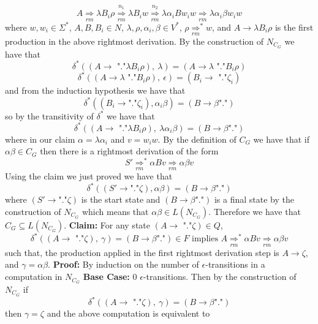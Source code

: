 \documentclass[12pt]{article}
\begin{document}
$$A \underset{rm}{\Longrightarrow} \lambda B_{i}\rho
\overset{n_1}{\underset{rm}{\Longrightarrow}} \lambda B_{i}w
\overset{n_2}{\underset{rm}{\Longrightarrow}} \lambda \alpha _{i}Bw_{i}w
\underset{rm}{\Longrightarrow} \lambda \alpha _{i}\beta w_{i}w$$
where $w,w_i \in \Sigma^*$, $A,B,B_i \in  N$,
$\lambda, \rho, \alpha_i, \beta\in  V^*$,
$\rho \underset{rm}{\Longrightarrow}^* w$, and
$A \rightarrow \lambda B_{i}\rho$ is the first production in the above rightmost
derivation. By the construction of $N_{C_G}$ we have that
$$\delta^*((A \rightarrow \text{ "."}\lambda B_i \rho),\ \lambda) =
(A \rightarrow \lambda\text{ "."} B_i \rho)$$
$$\delta^*((A \rightarrow \lambda\text{ "."} B_i \rho),\ \epsilon) =
(B_i \rightarrow \text{ "."}\zeta_i)$$
and from the induction hypothesis we have that
$$\delta^*((B_i \rightarrow\text{"."}\zeta_i), \alpha_i \beta) =
(B \rightarrow \beta\text{"."})$$
so by the transitivity of $\delta^*$ we have that
$$\delta^*((A \rightarrow \text{ "."}\lambda B_i \rho),\ \lambda\alpha_i\beta) =
(B \rightarrow \beta\text{"."})$$
where in our claim $\alpha = \lambda\alpha_i$ and $v = w_iw$.
By the definition of $C_G$ we have that if $\alpha\beta \in C_G$ then there
is a rightmost derivation of the form
$$S' \underset{rm}{\Longrightarrow}^* \alpha Bv
\underset{rm}{\Longrightarrow} \alpha\beta v$$
Using the claim we just proved we have that
$$\delta^*((S' \rightarrow \text{"."}\zeta), \alpha\beta) =
(B \rightarrow \beta\text{"."})$$
where $(S' \rightarrow \text{"."}\zeta)$ is the start state and
$(B \rightarrow \beta\text{"."})$ is a final state by the construction
of $N_{C_G}$ which means that $\alpha\beta \in L(N_{C_G})$.
Therefore we have that $C_G \subseteq L(N_{C_G})$.
\medskip\newline
\textbf{Claim: } For any state $(A \rightarrow \text{ "."}\zeta) \in Q$,
$$\delta^*((A \rightarrow \text{ "."}\zeta),\ \gamma) =
(B \rightarrow \beta\text{"."}) \in F \text{ implies }
A \underset{rm}{\Longrightarrow}^* \alpha Bv \underset{rm}{\Longrightarrow}
\alpha \beta v$$
such that, the production applied in the first
rightmost derivation step is $A \rightarrow \zeta$, and $\gamma=\alpha\beta$.
\medskip\newline
\textbf{Proof: } By induction on the number of $\epsilon$-transitions in a
computation in $N_{C_G}$
\medskip\newline
\textbf{Base Case:} 0 $\epsilon$-transitions. Then by the construction of
$N_{C_G}$ if
$$\delta^*((A \rightarrow \text{ "."}\zeta),\ \gamma) =
(B \rightarrow \beta\text{"."})$$
then $\gamma = \zeta$  and the above computation is equivalent to
\end{document}
